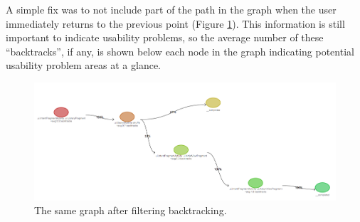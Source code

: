 A simple fix was to not include part of the path in the graph when the user immediately returns
to the previous point (Figure \ref{fig:task-navigation-mess-fixed}). This information is still important to indicate usability problems, so the average number of these ``backtracks'', if any, is shown below each node in the graph indicating potential usability problem areas at a glance.

\begin{figure}[h]
 \centering
 \includegraphics[width=\textwidth]{images/fixed-graph}
 \caption{The same graph after filtering backtracking.}
 \label{fig:task-navigation-mess-fixed}
\end{figure}